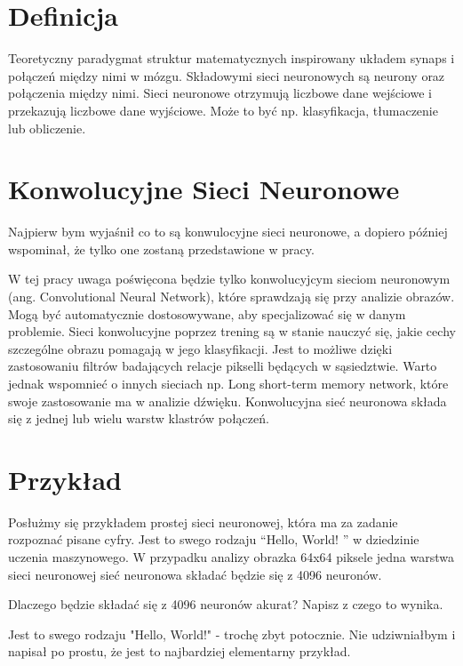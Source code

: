 \documentclass[brudnopis]{xmgr}
\begin{document}
\section{Definicja\label{s:dsssl}}

Teoretyczny paradygmat struktur matematycznych inspirowany układem synaps i połączeń między nimi w mózgu. Składowymi sieci neuronowych są neurony oraz połączenia między nimi. Sieci neuronowe otrzymują liczbowe dane wejściowe i przekazują liczbowe dane wyjściowe. Może to być np. klasyfikacja, tłumaczenie lub obliczenie.


\section{Konwolucyjne Sieci Neuronowe  \label{s:dsssl}}

Najpierw bym wyjaśnił co to są konwulocyjne sieci neuronowe, a dopiero później wspominał, że tylko one zostaną przedstawione w pracy.

W tej pracy uwaga poświęcona będzie tylko konwolucyjcym sieciom neuronowym (ang. Convolutional Neural Network), które sprawdzają się przy analizie obrazów.  
Mogą być automatycznie dostosowywane, aby specjalizować się w danym problemie.
Sieci konwolucyjne poprzez trening są w stanie nauczyć się, jakie cechy szczególne obrazu pomagają w jego klasyfikacji. Jest to możliwe dzięki zastosowaniu filtrów badających relacje pikselli będących w sąsiedztwie. Warto jednak wspomnieć o innych sieciach np. Long short-term memory network, które swoje zastosowanie ma w analizie dźwięku. Konwolucyjna sieć neuronowa składa się z jednej lub wielu warstw klastrów połączeń.






\section{Przykład  \label{s:dsssl}}

Posłużmy się przykładem prostej sieci neuronowej, która ma za zadanie rozpoznać pisane cyfry. Jest to swego rodzaju “Hello, World! ” w dziedzinie uczenia maszynowego.
W przypadku analizy obrazka 64x64 piksele jedna warstwa sieci neuronowej sieć neuronowa składać będzie się z 4096 neuronów.

Dlaczego będzie składać się z 4096 neuronów akurat? Napisz z czego to wynika.

Jest to swego rodzaju "Hello, World!" - trochę zbyt potocznie. Nie udziwniałbym i napisał po prostu, że jest to najbardziej elementarny przykład.
\end{document}
